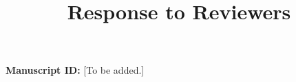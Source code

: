 \documentclass[en]{response}
\title{Response to Reviewers}
\begin{document}
\maketitle

\noindent\textbf{Manuscript ID:} [To be added.]


\responsecontents[2]

\newpage

\newpage

\end{document}
